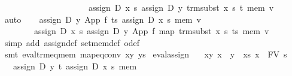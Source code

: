 \begin{isabellebody}
\ \ \ \ \ \ \ \ \ \ \ \ \ \ \ \ \ \ \ \ \ assign\ D\ x\ s\ {}assign\ D\ y\ {}trm{}subst\ x\ s\ t{}\ mem{}\ v{}\isanewline
\ \ \ \ \isamarkupfalse%
\ auto\isanewline
\ \ \isamarkupfalse%
\ {}assign\ D\ y\ {}App\ f\ ts{}\ {}assign\ D\ x\ s\ mem{}\ v\ {}\isanewline
\ \ \ \ \ \ \ \ assign\ D\ x\ s\ {}assign\ D\ y\ {}App\ f\ {}map\ {}trm{}subst\ x\ s{}\ ts{}{}\ mem{}\ v{}\isanewline
\ \ \ \ \isamarkupfalse%
\ {}simp\ add{}\ assign{}def\ set{}mem{}def\ o{}def{}\isanewline
\ \ \ \ \isamarkupfalse%
\ {}smt\ eval{}trm{}eq{}mem\ map{}eq{}conv\ xy\ ys{}\isanewline
{}\isamarkupfalse%
%
\endisatagproof
{\isafoldproof}%
%
\isadelimproof
\isanewline
%
\endisadelimproof
\isanewline
{}\isamarkupfalse%
\ eval{}assign{}{}\isanewline
\ \ \ xy{}\ {}x\ {}\ y{}\ \ xs{}\ {}x\ {}\ FV\ s{}\isanewline
\ \ \ {}assign\ D\ y\ t\ {}assign\ D\ x\ s\ mem{}\ {}\isanewline

\end{isabellebody}
